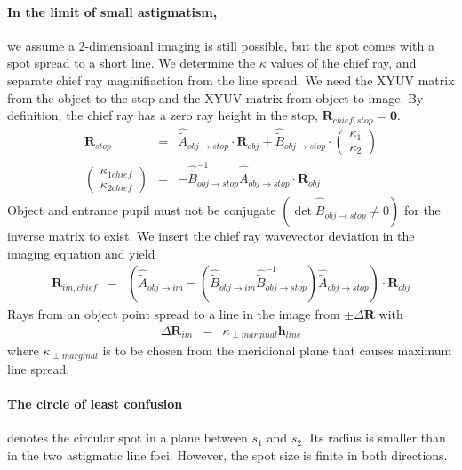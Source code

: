 \documentclass[12pt,a4paper,twoside,openright,BCOR10mm,headsepline,titlepage,abstracton,chapterprefix,final]{scrreprt}
\newcommand\Vector[1]{{\mathbf{#1}}}
\begin{document}
\paragraph{In the limit of small astigmatism,}
we assume a 2-dimensioanl imaging is still possible, but the spot comes with a spot spread to a short line.
We determine the $\kappa$ values of the chief ray, 
and separate chief ray maginifiaction from the line spread.
We need the XYUV matrix from the object to the stop and the XYUV matrix from object to image.
By definition, the chief ray has a zero ray height in the stop, $\Vector{R}_{chief, stop} = \Vector{0}$.
\begin{eqnarray}
 \Vector{R}_{stop} &=& \hat{\tilde{A}}_{obj\rightarrow stop} \cdot \Vector{R}_{obj}
                  +  \hat{\tilde{B}}_{obj\rightarrow stop} \cdot \begin{pmatrix} \kappa_1 \\ \kappa_2 \end{pmatrix}
 \\
 \begin{pmatrix} \kappa_{1 chief} \\ \kappa_{2 chief} \end{pmatrix}
 &=&
 - \hat{\tilde{B}}_{obj\rightarrow stop}^{-1} \hat{\tilde{A}}_{obj\rightarrow stop} \cdot \Vector{R}_{obj}
\end{eqnarray}
Object and entrance pupil must not be conjugate 
$(\det \hat{\tilde{B}}_{obj\rightarrow stop} \neq 0)$
for the inverse matrix to exist.
We insert the chief ray wavevector deviation in the imaging equation and yield
\begin{eqnarray}
 \Vector{R}_{im, chief} &=& 
     \left(
         \hat{\tilde{A}}_{obj\rightarrow im} 
       - \left(\hat{\tilde{B}}_{obj\rightarrow im} \hat{\tilde{B}}_{obj\rightarrow stop}^{-1} \right) \hat{\tilde{A}}_{obj\rightarrow stop}
     \right)
     \cdot \Vector{R}_{obj}
\end{eqnarray}
Rays from an object point spread to a line in the image from $\pm\Delta\Vector{R}$ with
\begin{eqnarray}
 \Delta\Vector{R}_{im} &=& \kappa_{\perp marginal} \Vector{h}_{line}
\end{eqnarray}
where $\kappa_{\perp marginal}$ is to be chosen from the meridional plane that causes maximum line spread.

\paragraph{The circle of least confusion} denotes the circular spot in a plane between $s_1$ and $s_2$.
Its radius is smaller than in the two astigmatic line foci.
However, the spot size is finite in both directions.
\end{document}
